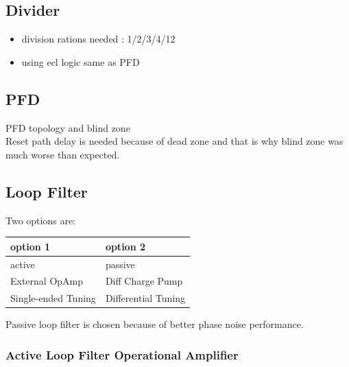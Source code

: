 \documentclass{article}
\begin{document}
\subsection{Divider}


\begin{itemize}
	\item division rations needed : 1/2/3/4/12
	\item using ecl logic same as PFD
\end{itemize}


\subsection{PFD} %

PFD topology and blind zone \\

Reset path delay is needed because of dead zone and that is why blind zone was much worse than expected. %
\\

\subsection{Loop Filter}

Two options are:

\begin{table}[!ht]
    \centering
    \begin{tabular}{|l|l|}
    \hline
		\rowcolor{LightCyan}
		option 1 & option 2 \\ \hline
        active & passive \\ \hline
        External OpAmp & Diff Charge Pump \\ \hline
        Single-ended Tuning & Differential Tuning \\ \hline
    \end{tabular}
\end{table}

Passive loop filter is chosen because of better phase noise performance.

\subsubsection*{Active Loop Filter Operational Amplifier}
\end{document}
